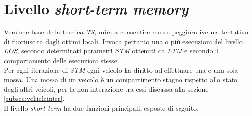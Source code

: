 \section{Livello \emph{short-term memory}}
	Versione base della tecnica \emph{TS}, mira a consentire mosse peggiorative nel tentativo di fuoriuscita dagli ottimi locali. 
	Invoca pertanto una o più esecuzioni del livello \emph{LOS}, secondo determinati parametri \emph{STM} ottenuti da \emph{LTM} e secondo il comportamento
	delle esecuzioni stesse.\\
	Per ogni iterazione di \emph{STM} ogni veicolo ha diritto ad effettuare una e una sola mossa. Una mossa di un veicolo è un compartimento stagno rispetto allo stato
	degli altri veicoli, per la non interazione tra essi discussa alla sezione \ref{subsec:vehicleinter}. \\ 
	Il livello \emph{short-term} ha due funzioni principali, esposte di seguito.
